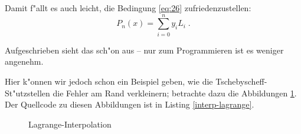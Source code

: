\documentclass[a4paper]{book}
\begin{document}
Damit f"allt es auch leicht, die Bedingung \eqref{eq:26}
zufriedenzustellen:
\begin{equation}
  \label{eq:31}
  P_n(x) = \sum_{i = 0}^n y_i L_i \;.
\end{equation}

Aufgeschrieben sieht das sch"on aus -- nur zum Programmieren ist es
weniger angenehm. 

Hier k"onnen wir jedoch schon ein Beispiel geben, wie die
Tschebyscheff-St"utzstellen die Fehler am Rand verkleinern; betrachte
dazu die Abbildungen \ref{fig:lagrange-interp}. Der Quellcode zu
diesen Abbildungen ist in Listing \ref{interp-lagrange}.

\begin{figure}
  \centering
  \caption{Lagrange-Interpolation}
  \label{fig:lagrange-interp}
\end{figure}
\end{document}
